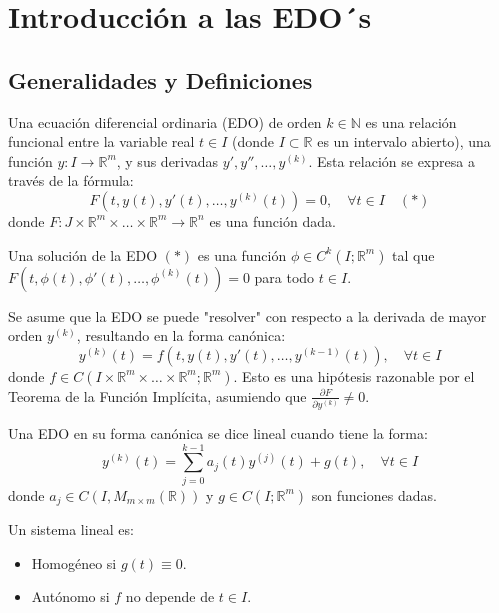 \section{Introducción a las EDO´s}

\subsection{Generalidades y Definiciones}
\begin{definition}
Una ecuación diferencial ordinaria (EDO) de orden $k \in \mathbb{N}$ es una relación funcional entre la variable real $t \in I$ (donde $I \subset \mathbb{R}$ es un intervalo abierto), una función $y: I \rightarrow \mathbb{R}^m$, y sus derivadas $y', y'', \dots, y^{(k)}$. Esta relación se expresa a través de la fórmula:
$$F(t, y(t), y'(t), \dots, y^{(k)}(t)) = 0, \quad \forall t \in I \quad (*)$$
donde $F: J \times \mathbb{R}^m \times \dots \times \mathbb{R}^m \rightarrow \mathbb{R}^n$ es una función dada.
\end{definition}

\begin{definition}
Una solución de la EDO $(*)$ es una función $\phi \in C^k(I; \mathbb{R}^m)$ tal que $F(t, \phi(t), \phi'(t), \dots, \phi^{(k)}(t)) = 0$ para todo $t \in I$.
\end{definition}

Se asume que la EDO se puede "resolver" con respecto a la derivada de mayor orden $y^{(k)}$, resultando en la forma canónica:
$$y^{(k)}(t) = f(t, y(t), y'(t), \dots, y^{(k-1)}(t)), \quad \forall t \in I$$
donde $f \in C(I \times \mathbb{R}^m \times \dots \times \mathbb{R}^m; \mathbb{R}^m)$. Esto es una hipótesis razonable por el Teorema de la Función Implícita, asumiendo que $\frac{\partial F}{\partial y^{(k)}} \ne 0$.

\begin{definition}
Una EDO en su forma canónica se dice lineal cuando tiene la forma:
$$y^{(k)}(t) = \sum_{j=0}^{k-1} a_j(t) y^{(j)}(t) + g(t), \quad \forall t \in I$$
donde $a_j \in C(I, M_{m \times m}(\mathbb{R}))$ y $g \in C(I; \mathbb{R}^m)$ son funciones dadas.
\end{definition}

\begin{remark}
Un sistema lineal es:
\begin{itemize}
    \item Homogéneo si $g(t) \equiv 0$.
    \item Autónomo si $f$ no depende de $t \in I$.
\end{itemize}
\end{remark}

